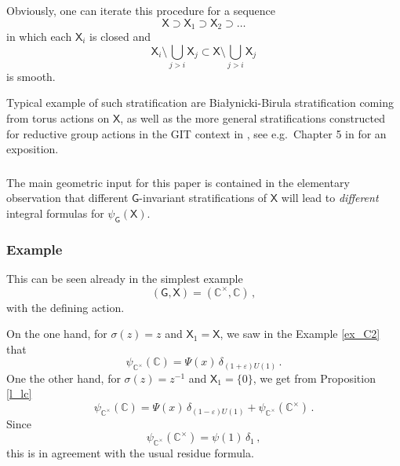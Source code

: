 \documentclass[14pt]{extarticle}
\newcommand{\C}{\mathbb{C}}
\newcommand{\Ct}{\mathbb{C}^\times}
\newcommand{\bG}{\mathsf{G}}
\newcommand{\bX}{\mathsf{X}}
\newcommand{\fn}{\mathfrak{n}}
\theoremstyle{definition}
\begin{document}
\subsubsection{}\label{s_BB}
Obviously, one can iterate this procedure for a sequence
\[
  \bX \supset \bX_1 \supset \bX_2 \supset \dots
\]
in which each $\bX_i$ is closed and
\[
  \bX_i \setminus \bigcup_{j>i} \bX_j \subset \bX \setminus \bigcup_{j>i} \bX_j
\]
is smooth.

Typical example of such stratification are Bia\l{}ynicki-Birula
stratification \cite{BB} coming from torus actions on $\bX$, as well as the
more general stratifications constructed for reductive group
actions in the GIT context in \cites{Bogo,Hess,Kempf,Ness,Rous}, see
e.g.\ Chapter 5 in \cite{VinPop} for an exposition.

\subsubsection{}

The main geometric input for this paper is contained in the elementary
observation that different $\bG$-invariant stratifications of $\bX$ will
lead to \emph{different} integral formulas for $\psi_\bG(\bX)$.

\subsubsection{Example}\label{s_exCC}

This can be seen already in the simplest example
\[
  (\bG,\bX) =  (\Ct ,\C) \,, 
\]
with the defining action.

On the one hand, for $\sigma(z) = z$ and $\bX_1 = \bX$, we saw in the
Example \ref{ex_C2} that
\[
  \psi_{\Ct}(\C) = 
 \Psi(x) \, \delta_{(1+\varepsilon)U(1)} \, .
\]
One the other hand, for $\sigma(z) = z^{-1}$ and $\bX_1 = \{0\}$, we get
from Proposition \ref{l_lc}
\[
  \psi_{\Ct}(\C) = \Psi(x) \, \delta_{(1-\varepsilon)U(1)} + \psi_{\Ct}(\Ct) \,. 
\]
Since
\[
  \psi_{\Ct}(\Ct)  = \psi(1) \, \delta_1 \,, 
\]
this is in agreement with the usual residue formula.

\end{document}
